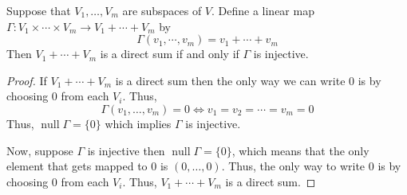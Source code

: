 \begin{proposition}
    Suppose that $V_1, \ldots, V_m$ are subspaces of $V$. Define a linear map $\Gamma : V_1 \times \cdots \times V_m \to V_1 + \cdots + V_m$
    by
    \[ \Gamma(v_1, \cdots, v_m) = v_1 + \cdots + v_m \]
    Then $V_1 + \cdots + V_m$ is a direct sum if and only if  $\Gamma$ is injective.
\end{proposition}

\begin{proof}
    If $V_1 + \cdots + V_m$ is a direct sum then the only way we can write $0$ is by choosing $0$ from each $V_i$. Thus,
    \[ \Gamma(v_1, \ldots, v_m) = 0 \iff v_1 = v_2 = \cdots = v_m = 0 \]
    Thus, $\operatorname{null} \Gamma = \{0\}$ which implies $\Gamma$ is injective.
    
    Now, suppose $\Gamma$ is injective then $\operatorname{null} \Gamma = \{0\}$, which means that the only element that gets mapped to $0$
    is $(0,\ldots,0)$. Thus, the only way to write $0$ is by choosing $0$ from each $V_i$. Thus, $V_1 + \cdots + V_m$ is a direct sum. 
\end{proof}

